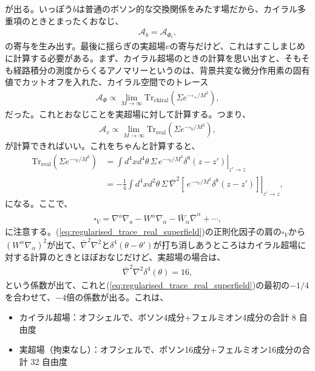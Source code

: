 \documentclass[paper=b5j,fontsize=12Q,jafontsize=12Q,baselineskip=21Q]{jlreq}
\begin{document}
\begin{refsection}
が出る。いっぽう$b$は普通のボソン的な交換関係をみたす場だから、カイラル多重項のときとまったくおなじ、
\begin{align}
  \mathcal A_{b}=\mathcal A_{\Phi_i},
\end{align}
の寄与を生み出す。最後に揺らぎの実超場$v$の寄与だけど、これはすこしまじめに計算する必要がある。まず、カイラル超場のときの計算を思い出すと、そもそも経路積分の測度からくるアノマリーというのは、背景共変な微分作用素の固有値でカットオフを入れた、カイラル空間でのトレース
\begin{align}
  \mathcal{A}_\Phi \propto \lim_{M \to \infty} \text{Tr}_{\text{chiral}} \left( \Sigma e^{-\square_+ / M^2} \right),
\end{align}
だった。これとおなじことを実超場に対して計算する。つまり、
\begin{align}
  \mathcal{A}_v \propto \lim_{M \to \infty} \text{Tr}_{\text{real}} \left( \Sigma e^{-\square_V / M^2} \right),
\end{align}
が計算できればいい。これをちゃんと計算すると、
\begin{align}
  \text{Tr}_{\text{real}} \left( \Sigma e^{-\square_V / M^2} \right)&=\left.\int d^4xd^4\theta\,\Sigma\,e^{-\square_V / M^2}\delta^8(z-z')\right|_{z'\to z}\\
  &=-\frac14\left.\int d^4xd^2\theta\,\Sigma\,\bar\nabla^2\left[\,e^{-\square_V / M^2}\delta^8(z-z')\right]\right|_{z'\to z},\label{eq:regularised_trace_real_superfield}
\end{align}
になる。ここで、
\begin{align}
  \square_V = \nabla^a \nabla_a - W^\alpha \nabla_\alpha - \bar{W}_{\dot{\alpha}} \bar{\nabla}^{\dot{\alpha}} + \cdots,\label{eq:d'Alembertian_real_superfield}
\end{align}
に注意する。(\ref{eq:regularised_trace_real_superfield})の正則化因子の肩の$\square_V$から$(W^\alpha\nabla_\alpha)^2$が出て、$\bar\nabla^2\nabla^2$と$\delta^4(\theta-\theta')$が打ち消しあうところはカイラル超場に対する計算のときとほぼおなじだけど、実超場の場合は、
\begin{align}
  \bar\nabla^2\nabla^2\delta^4(\theta)=16,
\end{align}
という係数が出て、これと(\ref{eq:regularised_trace_real_superfield})の最初の$-1/4$を合わせて、$-4$倍の係数が出る。これは、
\begin{itemize}
  \item カイラル超場：オフシェルで、ボソン4成分+フェルミオン4成分の合計 8 自由度
  \item 実超場（拘束なし）：オフシェルで、ボソン16成分+フェルミオン16成分の合計 32 自由度

\end{itemize}
\end{refsection}
\end{document}

